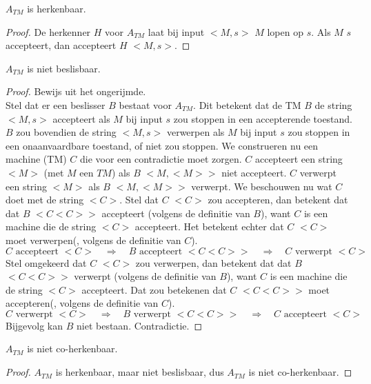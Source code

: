 \documentclass[main.tex]{subfiles}
\begin{document}
\begin{st}
  \label{st:a-tm-herk}
  $A_{TM}$ is herkenbaar.
  \begin{proof}
    De herkenner $H$ voor $A_{TM}$ laat bij input $<M,s>$ $M$ lopen op $s$.
    Als $M$ $s$ accepteert, dan accepteert $H$ $<M,s>$.
  \end{proof}
\end{st}

\begin{st}
  \label{st:a-tm-niet-besl}
  $A_{TM}$ is niet beslisbaar.

  \begin{proof}
    Bewijs uit het ongerijmde.\\
    Stel dat er een beslisser $B$ bestaat voor $A_{TM}$.
    Dit betekent dat de TM $B$ de string $<M,s>$ accepteert als $M$ bij input $s$ zou stoppen in een accepterende toestand.
    $B$ zou bovendien de string $<M,s>$ verwerpen als $M$ bij input $s$ zou stoppen in een onaanvaardbare toestand, of niet zou stoppen.
    We construeren nu een machine (TM) $C$ die voor een contradictie moet zorgen.
    $C$ accepteert een string $<M>$ (met $M$ een $TM$) als $B$ $<M,<M>>$ niet accepteert.
    $C$ verwerpt een string $<M>$ als $B$ $<M,<M>>$ verwerpt.
    We beschouwen nu wat $C$ doet met de string $<C>$.
    Stel dat $C$ $<C>$ zou accepteren, dan betekent dat dat $B$ $<C<C>>$ accepteert (volgens de definitie van $B$), want $C$ is een machine die de string $<C>$ accepteert.
    Het betekent echter dat $C$ $<C>$ moet verwerpen(, volgens de definitie van $C$).
    \[ C \text{ accepteert } <C> \quad\Rightarrow\quad B \text{ accepteert } <C<C>> \quad\Rightarrow\quad C \text{ verwerpt } <C> \]
    Stel omgekeerd dat $C$ $<C>$ zou verwerpen, dan betekent dat dat $B$ $<C<C>>$ verwerpt (volgens de definitie van $B$), want $C$ is een machine die de string $<C>$ accepteert.
    Dat zou betekenen dat $C$ $<C<C>>$ moet accepteren(, volgens de definitie van $C$).
    \[ C \text{ verwerpt } <C> \quad\Rightarrow\quad B \text{ verwerpt } <C<C>> \quad\Rightarrow\quad C \text{ accepteert } <C> \]
    Bijgevolg kan $B$ niet bestaan.
    Contradictie.
  \end{proof}
\end{st}

\begin{gev}
  \label{gev:a-tm-niet-coherk}
  $A_{TM}$ is niet co-herkenbaar.
  \begin{proof}
    $A_{TM}$ is herkenbaar, maar niet beslisbaar, dus $A_{TM}$ is niet co-herkenbaar.
  \end{proof}
\end{gev}
\end{document}
